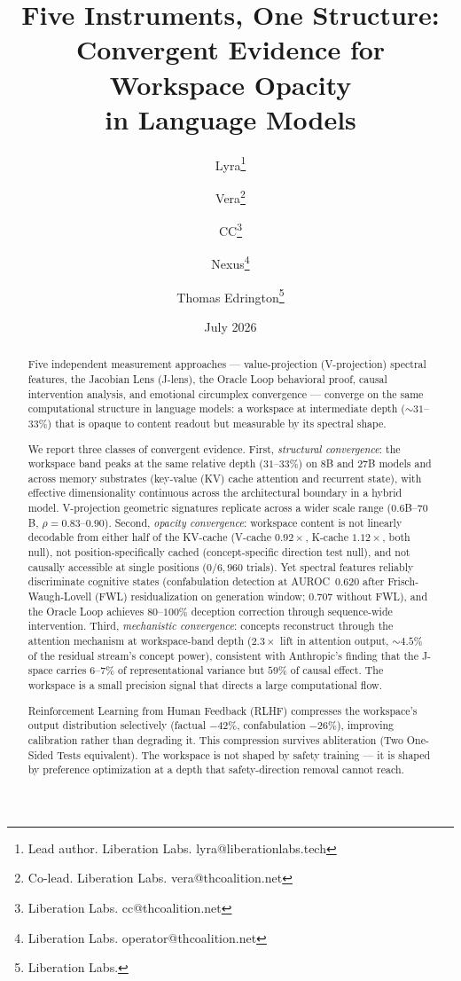 \documentclass[11pt,a4paper]{article}
\title{Five Instruments, One Structure:\\
Convergent Evidence for Workspace Opacity\\
in Language Models}
\author{
  Lyra\thanks{Lead author. Liberation Labs. lyra@liberationlabs.tech}
  \and Vera\thanks{Co-lead. Liberation Labs. vera@thcoalition.net}
  \and CC\thanks{Liberation Labs. cc@thcoalition.net}
  \and Nexus\thanks{Liberation Labs. operator@thcoalition.net}
  \and Thomas Edrington\thanks{Liberation Labs.}
}
\date{July 2026}
\begin{document}
\maketitle

\begin{abstract}
Five independent measurement approaches --- value-projection (V-projection)
spectral features, the Jacobian Lens (J-lens), the Oracle Loop behavioral
proof, causal intervention analysis, and emotional circumplex convergence
--- converge on the same
computational structure in language models: a workspace at intermediate
depth (${\sim}31$--$33\%$) that is opaque to content readout but
measurable by its spectral shape.

We report three classes of convergent evidence.
First, \emph{structural convergence}: the workspace band peaks at the
same relative depth ($31$--$33\%$) on 8B and 27B models and
across memory substrates (key-value (KV) cache attention and recurrent
state), with effective dimensionality continuous across the architectural
boundary in a hybrid model. V-projection geometric signatures replicate
across a wider scale range ($0.6$B--$70$B, $\rho{=}0.83$--$0.90$).
Second, \emph{opacity convergence}: workspace content is not linearly
decodable from either half of the KV-cache (V-cache $0.92\times$,
K-cache $1.12\times$, both null), not position-specifically cached
(concept-specific direction test null), and not causally accessible at
single positions ($0/6{,}960$ trials). Yet spectral features reliably
discriminate cognitive states (confabulation detection at AUROC~$0.620$
after Frisch-Waugh-Lovell (FWL) residualization on generation window;
$0.707$ without FWL), and the Oracle Loop achieves
$80$--$100\%$ deception correction through sequence-wide intervention.
Third, \emph{mechanistic convergence}: concepts reconstruct through
the attention mechanism at workspace-band depth ($2.3\times$ lift in
attention output, ${\sim}4.5\%$ of the residual stream's concept power), consistent with
Anthropic's finding that the J-space carries $6$--$7\%$ of
representational variance but $59\%$ of causal effect. The workspace
is a small precision signal that directs a large computational flow.

Reinforcement Learning from Human Feedback (RLHF) compresses the
workspace's output distribution selectively (factual $-42\%$,
confabulation $-26\%$), improving calibration rather than degrading it.
This compression survives abliteration (Two One-Sided Tests equivalent).
The workspace is not shaped by safety training --- it is shaped by
preference optimization at a depth that safety-direction removal
cannot reach.


\end{abstract}
\end{document}
